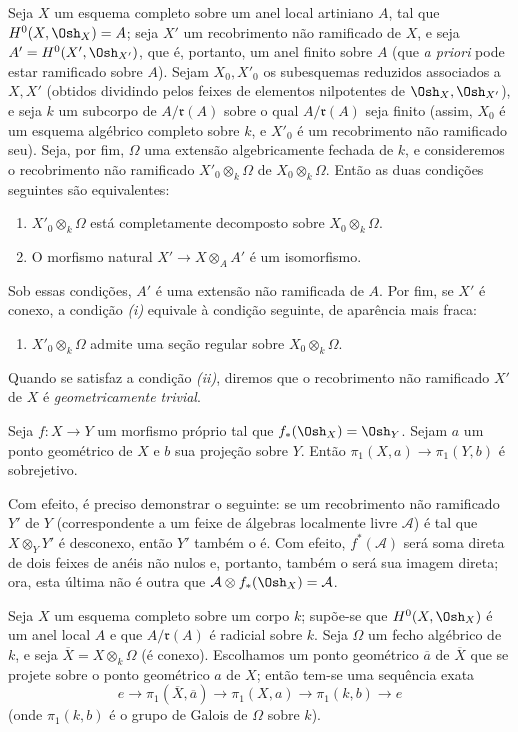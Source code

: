  Seja $X$ um esquema completo sobre um anel local artiniano
$A$, tal que $H^0(X,\Osh_X)=A$; seja $X'$ um recobrimento não ramificado de $X$,
e seja $A'=H^0(X',\Osh_{X'})$, que é, portanto, um anel finito sobre $A$
(que \textit{a priori} pode estar ramificado sobre $A$). Sejam $X_0,X'_0$ os
subesquemas reduzidos associados a $X,X'$ (obtidos dividindo pelos feixes de
elementos nilpotentes de $\Osh_X,\Osh_{X'}$), e seja $k$ um subcorpo de
$A/\mathfrak r(A)$ sobre o qual $A/\mathfrak r(A)$ seja finito (assim, $X_0$ é
um esquema algébrico completo sobre $k$, e $X'_0$ é um recobrimento não
ramificado seu). Seja, por fim, $\Omega$ uma extensão algebricamente
fechada de $k$, e consideremos o recobrimento não ramificado
$X'_0\otimes_k\Omega$ de $X_0\otimes_k\Omega$. Então as duas condições
seguintes são equivalentes:
\begin{enumerate}
  \item[\textit{i.}] $X'_0\otimes_k\Omega$ está completamente decomposto
    sobre $X_0\otimes_k\Omega$.
  \item[\textit{ii.}] O morfismo natural
    $X'\longrightarrow X\otimes_A A'$ é um isomorfismo.
\end{enumerate}
Sob essas condições, $A'$ é uma extensão não ramificada de $A$. Por fim,
se $X'$ é conexo, a condição \textit{(i)} equivale à condição seguinte,
de aparência mais fraca:
\begin{enumerate}
  \item[\textit{i bis.}] $X'_0\otimes_k\Omega$ admite uma seção regular
    sobre $X_0\otimes_k\Omega$.
\end{enumerate}
Quando se satisfaz a condição \textit{(ii)}, diremos que o recobrimento não
ramificado $X'$ de $X$ é \emph{geometricamente trivial}.

 Seja $f:X\longrightarrow Y$ um morfismo próprio tal que
$f_*(\Osh_X)=\Osh_Y$. Sejam $a$ um ponto geométrico de $X$ e $b$ sua projeção
sobre $Y$. Então $\pi_1(X,a)\longrightarrow\pi_1(Y,b)$ é sobrejetivo.

Com efeito, é preciso demonstrar o seguinte: se um recobrimento não ramificado
$Y'$ de $Y$ (correspondente a um feixe de álgebras localmente livre
$\mathcal A$) é tal que $X\otimes_Y Y'$ é desconexo, então $Y'$ também o
é. Com efeito, $f^*(\mathcal A)$ será soma direta de dois feixes de anéis não
nulos e, portanto, também o será sua imagem direta; ora, esta última
não é outra que $\mathcal A\otimes f_*(\Osh_X)=\mathcal A$.

 Seja $X$ um esquema completo sobre um corpo $k$; supõe-se que
$H^0(X,\Osh_X)$ é um anel local $A$ e que $A/\mathfrak r(A)$ é radicial
sobre $k$. Seja $\Omega$ um fecho algébrico de $k$, e seja
$\overline X=X\otimes_k\Omega$ (é conexo). Escolhamos um ponto geométrico
$\overline a$ de $\overline X$ que se projete sobre o ponto geométrico $a$ de
$X$; então tem-se uma sequência exata
\[
  e\longrightarrow\pi_1(\overline X,\overline a)
  \longrightarrow\pi_1(X,a)
  \longrightarrow\pi_1(k,b)\longrightarrow e
\]
(onde $\pi_1(k,b)$ é o grupo de Galois de $\Omega$ sobre $k$).

